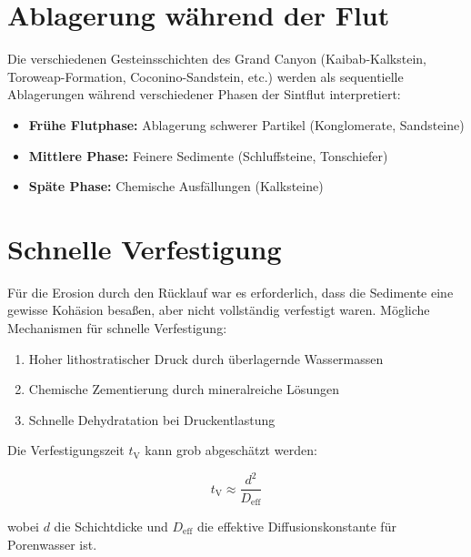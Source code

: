 ﻿\documentclass[12pt,a4paper]{report}
\begin{document}
\section{Ablagerung während der Flut}

Die verschiedenen Gesteinsschichten des Grand Canyon (Kaibab-Kalkstein, Toroweap-Formation, Coconino-Sandstein, etc.) werden als sequentielle Ablagerungen während verschiedener Phasen der Sintflut interpretiert:

\begin{itemize}
	\item \textbf{Frühe Flutphase:} Ablagerung schwerer Partikel (Konglomerate, Sandsteine)
	\item \textbf{Mittlere Phase:} Feinere Sedimente (Schluffsteine, Tonschiefer)
	\item \textbf{Späte Phase:} Chemische Ausfällungen (Kalksteine)
\end{itemize}

\section{Schnelle Verfestigung}

Für die Erosion durch den Rücklauf war es erforderlich, dass die Sedimente eine gewisse Kohäsion besaßen, aber nicht vollständig verfestigt waren. Mögliche Mechanismen für schnelle Verfestigung:

\begin{enumerate}
	\item Hoher lithostratischer Druck durch überlagernde Wassermassen
	\item Chemische Zementierung durch mineralreiche Lösungen
	\item Schnelle Dehydratation bei Druckentlastung
\end{enumerate}

Die Verfestigungszeit $t_{\text{V}}$ kann grob abgeschätzt werden:

\begin{equation}
	t_{\text{V}} \approx \frac{d^2}{D_{\text{eff}}}
\end{equation}

wobei $d$ die Schichtdicke und $D_{\text{eff}}$ die effektive Diffusionskonstante für Porenwasser ist.

\end{document}
